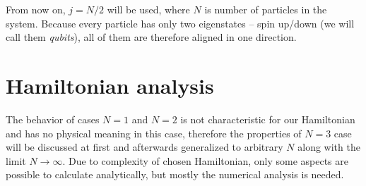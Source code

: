From now on, $j=N/2$ will be used, where $N$ is number of particles in the system. Because every particle has only two eigenstates -- spin up/down (we will call them \emph{qubits}), all of them are therefore aligned in one direction.


\section{Hamiltonian analysis}
The behavior of cases $N=1$ and $N=2$ is not characteristic for our Hamiltonian and has no physical meaning in this case, therefore the properties of $N=3$ case will be discussed at first and afterwards generalized to arbitrary $N$ along with the limit $N\rightarrow\infty$. Due to complexity of chosen Hamiltonian, only some aspects are possible to calculate analytically, but mostly the numerical analysis is needed.



